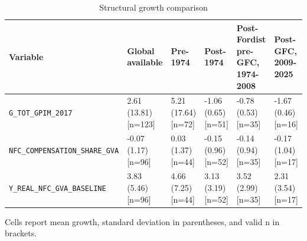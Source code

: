 \begin{landscape}
\begin{table}[p]
\centering
\small
\caption{Structural growth comparison}
\begin{tabular}{p{4.2cm}p{2.7cm}p{2.7cm}p{2.7cm}p{2.7cm}p{2.7cm}}
\toprule
Variable & Global available & Pre-1974 & Post-1974 & Post-Fordist pre-GFC, 1974-2008 & Post-GFC, 2009-2025
\\
\midrule
\nolinkurl{G_TOT_GPIM_2017} & 2.61 (13.81) [n=123] & 5.21 (17.64) [n=72] & -1.06 (0.65) [n=51] & -0.78 (0.53) [n=35] & -1.67 (0.46) [n=16]
\\
\nolinkurl{NFC_COMPENSATION_SHARE_GVA} & -0.07 (1.17) [n=96] & 0.03 (1.37) [n=44] & -0.15 (0.96) [n=52] & -0.14 (0.94) [n=35] & -0.17 (1.04) [n=17]
\\
\nolinkurl{Y_REAL_NFC_GVA_BASELINE} & 3.83 (5.46) [n=96] & 4.66 (7.25) [n=44] & 3.13 (3.19) [n=52] & 3.52 (2.99) [n=35] & 2.31 (3.54) [n=17]
\\
\bottomrule
\end{tabular}
\par\vspace{0.3em}\footnotesize Cells report mean growth, standard deviation in parentheses, and valid n in brackets.
\end{table}
\end{landscape}
